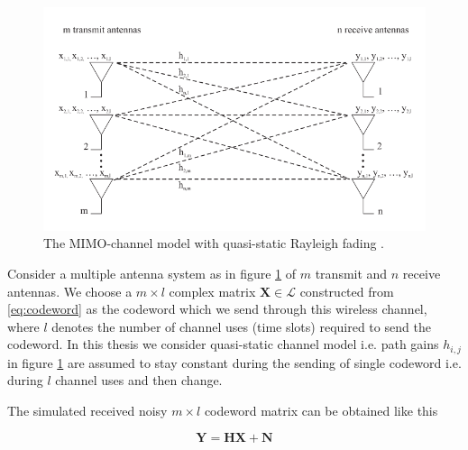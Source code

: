 \documentclass[english,12pt,a4paper,pdftex,sci,utf8]{aaltothesis}
\begin{document}
\begin{figure}[ht]
  \centering
  \includegraphics[width=\linewidth]{mimo}
  \caption{The MIMO-channel model with quasi-static Rayleigh fading \cite{mia}.}
  \label{fig:mimo}
\end{figure}

\par Consider a multiple antenna system as in figure \ref{fig:mimo} of $m$ transmit and $n$ receive antennas. We choose a $m\times l$ complex matrix $\mathbf{X} \in \mathcal{L}$ constructed from \eqref{eq:codeword} as the codeword which we send through this wireless channel, where $l$ denotes the number of channel uses (time slots) required to send the codeword. In this thesis we consider quasi-static channel model i.e. path gains $h_{i,j}$ in figure \ref{fig:mimo} are assumed to stay constant during the sending of single codeword i.e. during $l$ channel uses and then change. 
\par The simulated received noisy $m\times l$ codeword matrix can be obtained like this

\begin{equation}
\mathbf{Y} = \mathbf{HX} + \mathbf{N}
\label{eq:system}
\end{equation}
\end{document}

